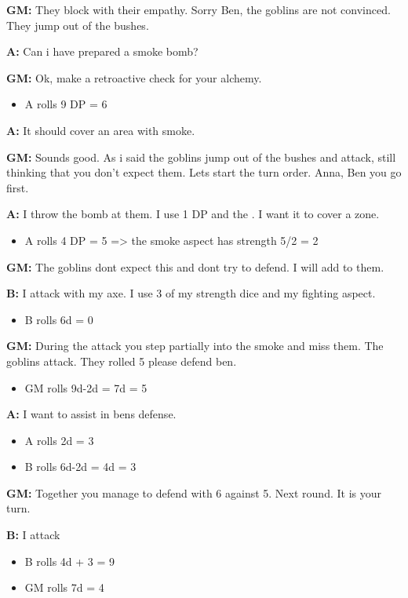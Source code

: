\documentclass[11pt]{article}
\begin{document}
{\textbf{GM:} They block with their empathy. Sorry Ben, the goblins are not convinced. They jump out of the bushes.

\textbf{A:} Can i have prepared a smoke bomb?

\textbf{GM:} Ok, make a retroactive check for your alchemy.
\begin{itemize}
\item A rolls 9 DP = 6
\end{itemize}

\textbf{A:} It should cover an area with smoke. 

\textbf{GM:} Sounds good. As i said the goblins jump out of the bushes and attack, still thinking that you don't expect them. Lets start the turn order. Anna, Ben you go first. 

\textbf{A:} I throw the bomb at them. I use 1 DP and the . I want it to cover a zone.
\begin{itemize}
\item A rolls 4 DP = 5 => the smoke aspect has strength 5/2 = 2
\end{itemize}

\textbf{GM:} The goblins dont expect this and dont try to defend. I will add  to them.

\textbf{B:} I attack with my axe. I use 3 of my strength dice and my fighting aspect.
\begin{itemize}
\item B rolls 6d = 0
\end{itemize}

\textbf{GM:} During the attack you step partially into the smoke and miss them. The goblins attack. They rolled 5 please defend ben.
\begin{itemize}
\item GM rolls 9d-2d = 7d = 5
\end{itemize}

\textbf{A:} I want to assist in bens defense.
\begin{itemize}
\item A rolls 2d = 3
\item B rolls 6d-2d = 4d = 3
\end{itemize}

\textbf{GM:} Together you manage to defend with 6 against 5. Next round. It is your turn.

\textbf{B:} I attack
\begin{itemize}
\item B rolls 4d + 3 = 9
\item GM rolls 7d = 4
\end{itemize}

}
\end{document}
